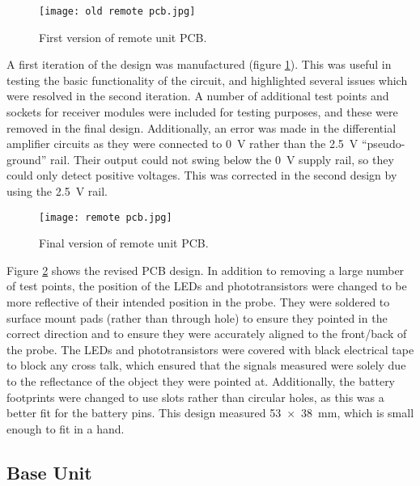 \begin{figure}[htbp]
	\centering
	\texttt{[image: old remote pcb.jpg]}
	\caption{First version of remote unit PCB.}
	\label{fig: old remote pcb}
\end{figure}

A first iteration of the design was manufactured (figure \ref{fig: old remote pcb}). This was useful in testing the basic functionality of the circuit, and highlighted several issues which were resolved in the second iteration. A number of additional test points and sockets for receiver modules were included for testing purposes, and these were removed in the final design. Additionally, an error was made in the differential amplifier circuits as they were connected to \SI{0}{\volt} rather than the \SI{2.5}{\volt} ``pseudo-ground'' rail. Their output could not swing below the \SI{0}{\volt} supply rail, so they could only detect positive voltages. This was corrected in the second design by using the \SI{2.5}{\volt} rail.\\



\begin{figure}[htbp]
	\centering
	\texttt{[image: remote pcb.jpg]}
	\caption{Final version of remote unit PCB.}
	\label{fig: remote pcb}
\end{figure}

Figure \ref{fig: remote pcb} shows the revised PCB design. In addition to removing a large number of test points, the position of the LEDs and phototransistors were changed to be more reflective of their intended position in the probe. They were soldered to surface mount pads (rather than through hole) to ensure they pointed in the correct direction and to ensure they were accurately aligned to the front/back of the probe. The LEDs and phototransistors were covered with black electrical tape to block any cross talk, which ensured that the signals measured were solely due to the reflectance of the object they were pointed at. Additionally, the battery footprints were changed to use slots rather than circular holes, as this was a better fit for the battery pins. This design measured \SI{53x38}{\milli\metre}, which is small enough to fit in a hand.\\






\subsection{Base Unit}

